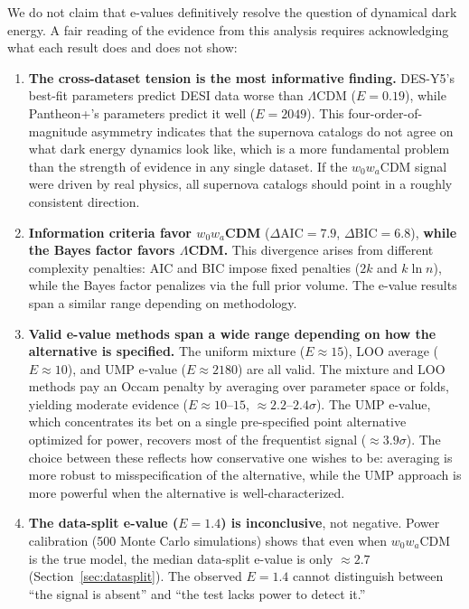 \documentclass[11pt,a4paper]{article}
\newcommand{\LCDM}{$\Lambda$CDM}
\begin{document}
We do not claim that e-values definitively resolve the question of dynamical dark energy. A fair reading of the evidence from this analysis requires acknowledging what each result does and does not show:

\begin{enumerate}
    \item \textbf{The cross-dataset tension is the most informative finding.} DES-Y5's best-fit parameters predict DESI data worse than \LCDM{} ($E = 0.19$), while Pantheon+'s parameters predict it well ($E = 2049$). This four-order-of-magnitude asymmetry indicates that the supernova catalogs do not agree on what dark energy dynamics look like, which is a more fundamental problem than the strength of evidence in any single dataset. If the $w_0w_a$CDM signal were driven by real physics, all supernova catalogs should point in a roughly consistent direction.

    \item \textbf{Information criteria favor $w_0w_a$CDM} ($\Delta\text{AIC} = 7.9$, $\Delta\text{BIC} = 6.8$), \textbf{while the Bayes factor favors \LCDM.} This divergence arises from different complexity penalties: AIC and BIC impose fixed penalties ($2k$ and $k\ln n$), while the Bayes factor penalizes via the full prior volume. The e-value results span a similar range depending on methodology.

    \item \textbf{Valid e-value methods span a wide range depending on how the alternative is specified.} The uniform mixture ($E \approx 15$), LOO average ($E \approx 10$), and UMP e-value ($E \approx 2180$) are all valid. The mixture and LOO methods pay an Occam penalty by averaging over parameter space or folds, yielding moderate evidence ($E \approx 10$--$15$, $\approx 2.2$--$2.4\sigma$). The UMP e-value, which concentrates its bet on a single pre-specified point alternative optimized for power, recovers most of the frequentist signal ($\approx 3.9\sigma$). The choice between these reflects how conservative one wishes to be: averaging is more robust to misspecification of the alternative, while the UMP approach is more powerful when the alternative is well-characterized.

    \item \textbf{The data-split e-value ($E = 1.4$) is inconclusive}, not negative. Power calibration (500 Monte Carlo simulations) shows that even when $w_0w_a$CDM is the true model, the median data-split e-value is only $\approx 2.7$ (Section~\ref{sec:datasplit}). The observed $E = 1.4$ cannot distinguish between ``the signal is absent'' and ``the test lacks power to detect it.''


\end{enumerate}
\end{document}
